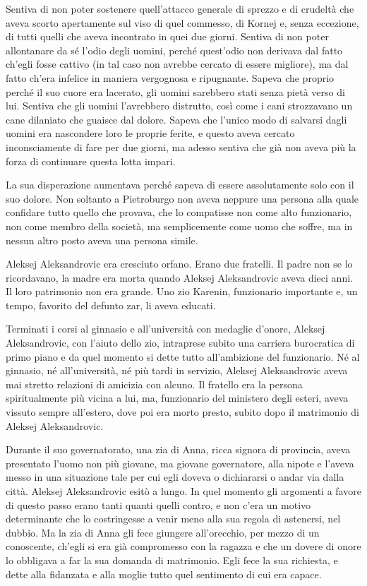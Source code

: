 Sentiva di non poter sostenere quell'attacco generale di sprezzo e di crudeltà che aveva scorto apertamente sul viso di quel commesso, di Kornej e, senza eccezione, di tutti quelli che aveva incontrato in quei due giorni. Sentiva di non poter allontanare da sé l'odio degli uomini, perché quest'odio non derivava dal fatto ch'egli fosse cattivo (in tal caso non avrebbe cercato di essere migliore), ma dal fatto ch'era infelice in maniera vergognosa e ripugnante. Sapeva che proprio perché il suo cuore era lacerato, gli uomini sarebbero stati senza pietà verso di lui. Sentiva che gli uomini l'avrebbero distrutto, così come i cani strozzavano un cane dilaniato che guaisce dal dolore. Sapeva che l'unico modo di salvarsi dagli uomini era nascondere loro le proprie ferite, e questo aveva cercato inconsciamente di fare per due giorni, ma adesso sentiva che già non aveva più la forza di continuare questa lotta impari. 

La sua disperazione aumentava perché sapeva di essere assolutamente solo con il suo dolore. Non soltanto a Pietroburgo non aveva neppure una persona alla quale confidare tutto quello che provava, che lo compatisse non come alto funzionario, non come membro della società, ma semplicemente come uomo che soffre, ma in nessun altro posto aveva una persona simile. 

Aleksej Aleksandrovic era cresciuto orfano. Erano due fratelli. Il padre non se lo ricordavano, la madre era morta quando Aleksej Aleksandrovic aveva dieci anni. Il loro patrimonio non era grande. Uno zio Karenin, funzionario importante e, un tempo, favorito del defunto zar, li aveva educati. 

Terminati i corsi al ginnasio e all'università con medaglie d'onore, Aleksej Aleksandrovic, con l'aiuto dello zio, intraprese subito una carriera burocratica di primo piano e da quel momento si dette tutto all'ambizione del funzionario. Né al ginnasio, né all'università, né più tardi in servizio, Aleksej Aleksandrovic aveva mai stretto relazioni di amicizia con alcuno. Il fratello era la persona spiritualmente più vicina a lui, ma, funzionario del ministero degli esteri, aveva vissuto sempre all'estero, dove poi era morto presto, subito dopo il matrimonio di Aleksej Aleksandrovic. 

Durante il suo governatorato, una zia di Anna, ricca signora di provincia, aveva presentato l'uomo non più giovane, ma giovane governatore, alla nipote e l'aveva messo in una situazione tale per cui egli doveva o dichiararsi o andar via dalla città. Aleksej Aleksandrovic esitò a lungo. In quel momento gli argomenti a favore di questo passo erano tanti quanti quelli contro, e non c'era un motivo determinante che lo costringesse a venir meno alla sua regola di astenersi, nel dubbio. Ma la zia di Anna gli fece giungere all'orecchio, per mezzo di un conoscente, ch'egli si era già compromesso con la ragazza e che un dovere di onore lo obbligava a far la sua domanda di matrimonio. Egli fece la sua richiesta, e dette alla fidanzata e alla moglie tutto quel sentimento di cui era capace. 

